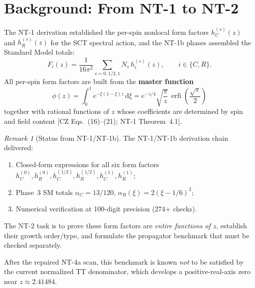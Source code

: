 \documentclass[12pt,a4paper]{article}
\theoremstyle{definition}
\theoremstyle{remark}
\newtheorem{remark}[proposition]{Remark}
\newcommand{\dd}{\mathrm{d}}
\newcommand{\erfi}{\operatorname{erfi}}
\newcommand{\fromlit}[1]{\textcolor{blue!70!black}{\textsf{[#1]}}}
\begin{document}
\tableofcontents
\newpage

\section{Background: From NT-1 to NT-2}
\label{sec:background}

The NT-1 derivation established the per-spin nonlocal form factors
$h_C^{(s)}(z)$ and $h_R^{(s)}(z)$ for the SCT spectral action, and the
NT-1b phases assembled the Standard Model totals:
\begin{equation}
  F_i(z) = \frac{1}{16\pi^2}\sum_{s=0,1/2,1} N_s\, h_i^{(s)}(z),
  \qquad i \in \{C, R\}.
  \label{eq:Fi-definition}
\end{equation}
All per-spin form factors are built from the \textbf{master function}
\begin{equation}
  \boxed{
  \phi(z) = \int_0^1 e^{-\xi(1-\xi)z}\,\dd\xi
  = e^{-z/4}\sqrt{\frac{\pi}{z}}\,\erfi\!\left(\frac{\sqrt{z}}{2}\right)
  }
  \label{eq:phi-master}
\end{equation}
together with rational functions of $z$ whose coefficients are
determined by spin and field content
\fromlit{CZ Eqs.~(16)--(21); NT-1 Theorem~4.1}.

\begin{remark}[Status from NT-1/NT-1b]
\label{rem:nt1-status}
The NT-1/NT-1b derivation chain delivered:
\begin{enumerate}[nosep]
  \item Closed-form expressions for all six form factors
    $h_C^{(0)}, h_R^{(0)}, h_C^{(1/2)}, h_R^{(1/2)},
     h_C^{(1)}, h_R^{(1)}$;
  \item Phase~3 SM totals $\alpha_C = 13/120$,
    $\alpha_R(\xi) = 2(\xi-1/6)^2$;
  \item Numerical verification at 100-digit precision (274+ checks).
\end{enumerate}
The NT-2 task is to prove these form factors are
\emph{entire functions of $z$}, establish their growth order/type,
and formulate the propagator benchmark that must be checked separately.
\par\smallskip
After the repaired NT-4a scan, this benchmark is known \emph{not} to be
satisfied by the current normalized TT denominator, which develops a
positive-real-axis zero near $z \approx 2.41484$.
\end{remark}
\end{document}
